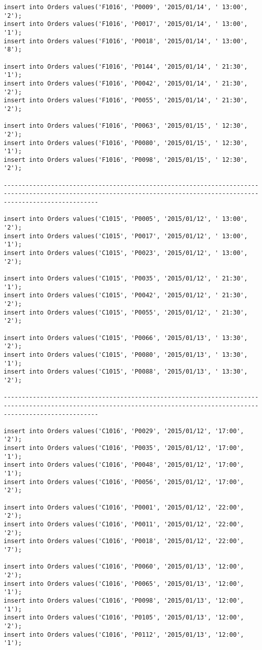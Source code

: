 \documentclass[a4,12pt]{report}
\begin{document}
\begin{lstlisting}
insert into Orders values('F1016', 'P0009', '2015/01/14', ' 13:00', '2');
insert into Orders values('F1016', 'P0017', '2015/01/14', ' 13:00', '1');
insert into Orders values('F1016', 'P0018', '2015/01/14', ' 13:00', '8');

insert into Orders values('F1016', 'P0144', '2015/01/14', ' 21:30', '1');
insert into Orders values('F1016', 'P0042', '2015/01/14', ' 21:30', '2');
insert into Orders values('F1016', 'P0055', '2015/01/14', ' 21:30', '2');

insert into Orders values('F1016', 'P0063', '2015/01/15', ' 12:30', '2');
insert into Orders values('F1016', 'P0080', '2015/01/15', ' 12:30', '1');
insert into Orders values('F1016', 'P0098', '2015/01/15', ' 12:30', '2');

----------------------------------------------------------------------------------------------------------------------------------------------------------------------

insert into Orders values('C1015', 'P0005', '2015/01/12', ' 13:00', '2');
insert into Orders values('C1015', 'P0017', '2015/01/12', ' 13:00', '1');
insert into Orders values('C1015', 'P0023', '2015/01/12', ' 13:00', '2');

insert into Orders values('C1015', 'P0035', '2015/01/12', ' 21:30', '1');
insert into Orders values('C1015', 'P0042', '2015/01/12', ' 21:30', '2');
insert into Orders values('C1015', 'P0055', '2015/01/12', ' 21:30', '2');

insert into Orders values('C1015', 'P0066', '2015/01/13', ' 13:30', '2');
insert into Orders values('C1015', 'P0080', '2015/01/13', ' 13:30', '1');
insert into Orders values('C1015', 'P0088', '2015/01/13', ' 13:30', '2');

----------------------------------------------------------------------------------------------------------------------------------------------------------------------

insert into Orders values('C1016', 'P0029', '2015/01/12', '17:00', '2');
insert into Orders values('C1016', 'P0035', '2015/01/12', '17:00', '1');
insert into Orders values('C1016', 'P0048', '2015/01/12', '17:00', '1');
insert into Orders values('C1016', 'P0056', '2015/01/12', '17:00', '2');

insert into Orders values('C1016', 'P0001', '2015/01/12', '22:00', '2');
insert into Orders values('C1016', 'P0011', '2015/01/12', '22:00', '2');
insert into Orders values('C1016', 'P0018', '2015/01/12', '22:00', '7');

insert into Orders values('C1016', 'P0060', '2015/01/13', '12:00', '2');
insert into Orders values('C1016', 'P0065', '2015/01/13', '12:00', '1');
insert into Orders values('C1016', 'P0098', '2015/01/13', '12:00', '1');
insert into Orders values('C1016', 'P0105', '2015/01/13', '12:00', '2');
insert into Orders values('C1016', 'P0112', '2015/01/13', '12:00', '1');


\end{lstlisting}
\end{document}
